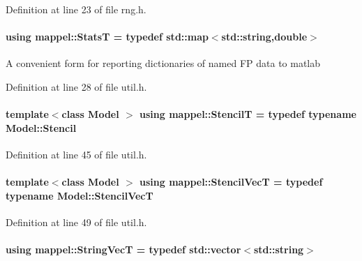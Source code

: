 Definition at line 23 of file rng.\+h.

\paragraph[{\texorpdfstring{StatsT}{StatsT}}]{\setlength{\rightskip}{0pt plus 5cm}using {\bf mappel\+::\+StatsT} = typedef std\+::map$<$std\+::string,double$>$}\hypertarget{namespacemappel_a04ab395b0cf82c4ce68a36b2212649a5}{}\label{namespacemappel_a04ab395b0cf82c4ce68a36b2212649a5}
A convenient form for reporting dictionaries of named FP data to matlab 

Definition at line 28 of file util.\+h.

\paragraph[{\texorpdfstring{StencilT}{StencilT}}]{\setlength{\rightskip}{0pt plus 5cm}template$<$class Model $>$ using {\bf mappel\+::\+StencilT} = typedef typename Model\+::\+Stencil}\hypertarget{namespacemappel_a3a06598240007876f8c4bf834ad86197}{}\label{namespacemappel_a3a06598240007876f8c4bf834ad86197}


Definition at line 45 of file util.\+h.

\paragraph[{\texorpdfstring{Stencil\+VecT}{StencilVecT}}]{\setlength{\rightskip}{0pt plus 5cm}template$<$class Model $>$ using {\bf mappel\+::\+Stencil\+VecT} = typedef typename Model\+::\+Stencil\+VecT}\hypertarget{namespacemappel_a62f73447ef1973cca188b1b801864f7e}{}\label{namespacemappel_a62f73447ef1973cca188b1b801864f7e}


Definition at line 49 of file util.\+h.

\paragraph[{\texorpdfstring{String\+VecT}{StringVecT}}]{\setlength{\rightskip}{0pt plus 5cm}using {\bf mappel\+::\+String\+VecT} = typedef std\+::vector$<$std\+::string$>$}\hypertarget{namespacemappel_aae88cf18bccfbb789a6019bcfbbfca68}{}\label{namespacemappel_aae88cf18bccfbb789a6019bcfbbfca68}


